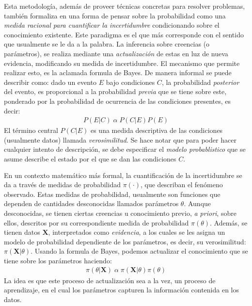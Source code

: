 \documentclass[../Main/Main.tex]{subfiles}
\begin{document}
Esta metodología, además de proveer técnicas concretas para resolver problemas, también formaliza en una forma de pensar sobre la probabilidad como una \textit{medida racional para cuantificar la incertidumbre} condicionando sobre el conocimiento existente. Este paradigma es el que más corresponde con el sentido que usualmente se le da a la palabra. La inferencia sobre creencias (o parámetros), se realiza mediante una \textit{actualización} de estas en luz de nueva evidencia, modificando su medida de incertidumbre. El mecanismo que permite realizar esto, es la aclamada formula de Bayes. De manera informal se puede describir como: dado un evento $E$ bajo condiciones $C$, la probabilidad \textit{posterior} del evento, es proporcional a la probabilidad \textit{previa} que se tiene sobre este, ponderado por la probabilidad de ocurrencia de las condiciones presentes, es decir: 
\begin{align}
P(E|C) \; \alpha \; P(C|E)P(E) \label{ec:BayesInformal}
\end{align}
El término central $P(C|E)$ es una medida descriptiva de las condiciones (usualmente datos) llamada \textit{verosimilitud}. Se hace notar que para poder hacer cualquier intento de descripción, se debe especificar el \textit{modelo probablistico} que se asume describe el estado por el que se dan las condiciones $C$. 

En un contexto matemático más formal, la cuantificación de la incertidumbre se da a través de medidas de probabilidad $\pi(\cdot)$, que describan el fenómeno observado. Estas medidas de probabilidad, usualmente son funciones que dependen de cantidades desconocidas llamados parámetros $\theta$. Aunque desconocidas, se tienen ciertas creencias u conocimiento previo, \textit{a priori}, sobre ellos, descritos por su correspondiente medida de probabilidad $\pi(\theta)$. Además, se tienen datos $\mathbf{X}$, interpretados como \textit{evidencia}, a los cuales se les asigna un modelo de probabilidad dependiente de los parámetros, es decir, su verosimilitud: $\pi(\mathbf{X}|\theta)$. Usando la formula de Bayes, podemos actualizar el conocimiento que se tiene sobre los parámetros haciendo:
\begin{align}
	\pi(\theta|\mathbf{X}) \; \alpha \; \pi(\mathbf{X}|\theta)\pi(\theta) \label{ec:BayesProporcional}
\end{align}
La idea es que este proceso de actualización sea a la vez, un proceso de aprendizaje, en el cual los parámetros capturen la información contenida en los datos.
\end{document}
